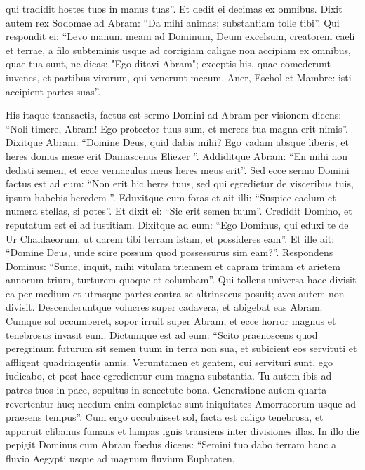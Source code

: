 \begin{biblechapter}
\begin{biblechapter}
\begin{biblechapter}
\begin{biblechapter}
\begin{biblechapter}
\begin{biblechapter}
\begin{biblechapter}
\begin{biblechapter}
\begin{biblechapter}
\begin{biblechapter}
\begin{biblechapter}
\begin{biblechapter}
\begin{biblechapter}
\begin{biblechapter}
 qui tradidit hostes tuos in manus tuas”.
 Et dedit ei decimas ex omnibus. 
\verse Dixit autem rex Sodomae ad Abram: “Da mihi animas; substantiam tolle tibi”. 
\verse Qui respondit ei: “Levo manum meam ad Dominum, Deum excelsum, creatorem caeli et terrae,
\verse a filo subteminis usque ad corrigiam caligae non accipiam ex omnibus, quae tua sunt, ne dicas: "Ego ditavi Abram"; 
\verse exceptis his, quae comederunt iuvenes, et partibus virorum, qui venerunt mecum, Aner, Eschol et Mambre: isti accipient partes suas”.
 
\begin{biblechapter}
\verse His itaque transactis, factus est sermo Domini ad Abram per visionem dicens: “Noli timere, Abram! Ego protector tuus sum, et merces tua magna erit nimis”. 
\verse Dixitque Abram: “Domine Deus, quid dabis mihi? Ego vadam absque liberis, et heres domus meae erit Damascenus Eliezer ”. 
\verse Addiditque Abram: “En mihi non dedisti semen, et ecce vernaculus meus heres meus erit”. 
\verse Sed ecce sermo Domini factus est ad eum: “Non erit hic heres tuus, sed qui egredietur de visceribus tuis, ipsum habebis heredem ”. 
\verse Eduxitque eum foras et ait illi: “Suspice caelum et numera stellas, si potes”. Et dixit ei: “Sic erit semen tuum”. 
\verse Credidit Domino, et reputatum est ei ad iustitiam.
 \verse Dixitque ad eum: “Ego Dominus, qui eduxi te de Ur Chaldaeorum, ut darem tibi terram istam, et possideres eam”. 
\verse Et ille ait: “Domine Deus, unde scire possum quod possessurus sim eam?”. 
\verse Respondens Dominus: “Sume, inquit, mihi vitulam triennem et capram trimam et arietem annorum trium, turturem quoque et columbam”. 
\verse Qui tollens universa haec divisit ea per medium et utrasque partes contra se altrinsecus posuit; aves autem non divisit. 
\verse Descenderuntque volucres super cadavera, et abigebat eas Abram.
 \verse Cumque sol occumberet, sopor irruit super Abram, et ecce horror magnus et tenebrosus invasit eum. 
\verse Dictumque est ad eum: “Scito praenoscens quod peregrinum futurum sit semen tuum in terra non sua, et subicient eos servituti et affligent quadringentis annis. 
\verse Verumtamen et gentem, cui servituri sunt, ego iudicabo, et post haec egredientur cum magna substantia. 
\verse Tu autem ibis ad patres tuos in pace, sepultus in senectute bona. 
\verse Generatione autem quarta revertentur huc; necdum enim completae sunt iniquitates Amorraeorum usque ad praesens tempus”.
 \verse Cum ergo occubuisset sol, facta est caligo tenebrosa, et apparuit clibanus fumans et lampas ignis transiens inter divisiones illas.
 \verse In illo die pepigit Dominus cum Abram foedus dicens: “Semini tuo dabo terram hanc a fluvio Aegypti usque ad magnum fluvium Euphraten, 

\end{biblechapter}
\end{biblechapter}
\end{biblechapter}
\end{biblechapter}
\end{biblechapter}
\end{biblechapter}
\end{biblechapter}
\end{biblechapter}
\end{biblechapter}
\end{biblechapter}
\end{biblechapter}
\end{biblechapter}
\end{biblechapter}
\end{biblechapter}
\end{biblechapter}
